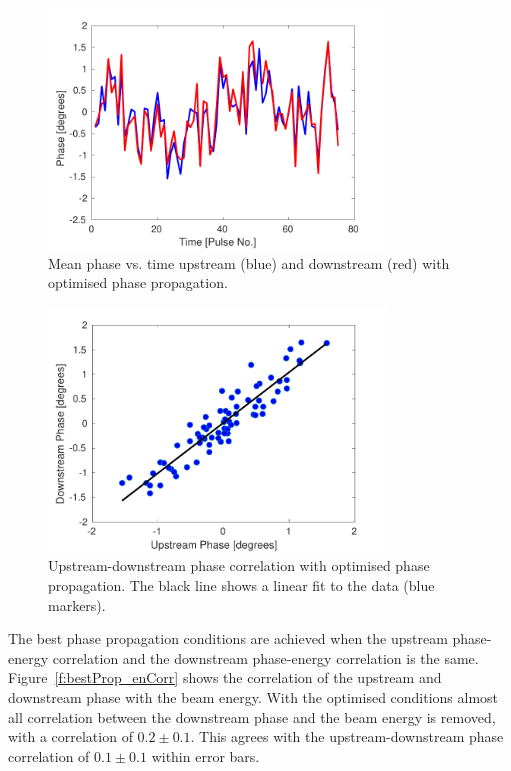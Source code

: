 \begin{figure}
  \centering
  \includegraphics[width=0.8\textwidth]{Figures/propagation/bestProp_meanPhase}
  \caption{Mean phase vs. time upstream (blue) and downstream (red) with optimised phase propagation.}
  \label{f:bestProp_meanPhase}
\end{figure}

\begin{figure}
  \centering
  \includegraphics[width=0.8\textwidth]{Figures/propagation/bestProp_meanCorr}
  \caption{Upstream-downstream phase correlation with optimised phase propagation. The black line shows a linear fit to the data (blue markers).}
  \label{f:bestProp_meanCorr}
\end{figure}

The best phase propagation conditions are achieved when the upstream phase-energy correlation and the downstream phase-energy correlation is the same. Figure~\ref{f:bestProp_enCorr} shows the correlation of the upstream and downstream phase with the beam energy. With the optimised conditions almost all correlation between the downstream phase and the beam energy is removed, with a correlation of \(0.2\pm0.1\). This agrees with the upstream-downstream phase correlation of \(0.1\pm0.1\) within error bars.

